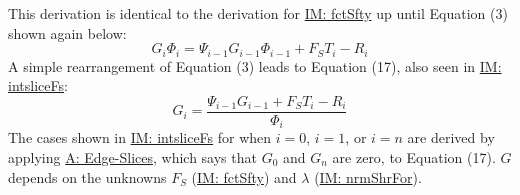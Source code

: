 \documentclass[12pt]{article}
\begin{document}
This derivation is identical to the derivation for \hyperref[IM:fctSfty]{IM: fctSfty} up until Equation (3) shown again below:
\begin{displaymath}
G_{i} Φ_{i}=Ψ_{i-1} G_{i-1} Φ_{i-1}+{F_{S}} T_{i}-R_{i}
\end{displaymath}
A simple rearrangement of Equation (3) leads to Equation (17), also seen in \hyperref[IM:intsliceFs]{IM: intsliceFs}:
\begin{displaymath}
G_{i}=\frac{Ψ_{i-1} G_{i-1}+{F_{S}} T_{i}-R_{i}}{Φ_{i}}
\end{displaymath}
The cases shown in \hyperref[IM:intsliceFs]{IM: intsliceFs} for when $i=0$, $i=1$, or $i=n$ are derived by applying \hyperref[assumpES]{A: Edge-Slices}, which says that $G_{0}$ and $G_{n}$ are zero, to Equation (17). $G$ depends on the unknowns ${F_{S}}$ (\hyperref[IM:fctSfty]{IM: fctSfty}) and $λ$ (\hyperref[IM:nrmShrFor]{IM: nrmShrFor}).
\par~
\end{document}
